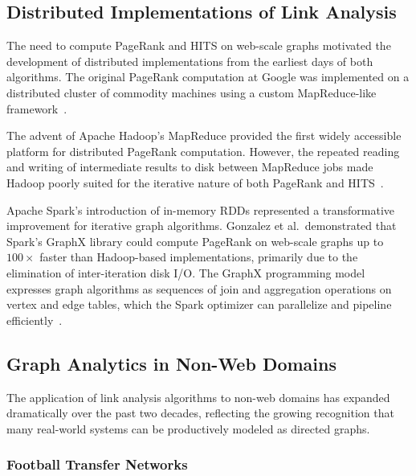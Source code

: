 \subsection{Distributed Implementations of Link Analysis}
\label{subsec:lit_distributed}

The need to compute PageRank and HITS on web-scale graphs motivated the development of distributed implementations from the earliest days of both algorithms. The original PageRank computation at Google was implemented on a distributed cluster of commodity machines using a custom MapReduce-like framework~\cite{brin1998pagerank}.

The advent of Apache Hadoop's MapReduce provided the first widely accessible platform for distributed PageRank computation. However, the repeated reading and writing of intermediate results to disk between MapReduce jobs made Hadoop poorly suited for the iterative nature of both PageRank and HITS~\cite{spark_graphx}.

Apache Spark's introduction of in-memory RDDs represented a transformative improvement for iterative graph algorithms. Gonzalez et al.\ demonstrated that Spark's GraphX library could compute PageRank on web-scale graphs up to $100\times$ faster than Hadoop-based implementations, primarily due to the elimination of inter-iteration disk I/O. The GraphX programming model expresses graph algorithms as sequences of join and aggregation operations on vertex and edge tables, which the Spark optimizer can parallelize and pipeline efficiently~\cite{spark_graphx}.


\subsection{Graph Analytics in Non-Web Domains}
\label{subsec:lit_nonweb}

The application of link analysis algorithms to non-web domains has expanded dramatically over the past two decades, reflecting the growing recognition that many real-world systems can be productively modeled as directed graphs.

\subsubsection{Football Transfer Networks}

